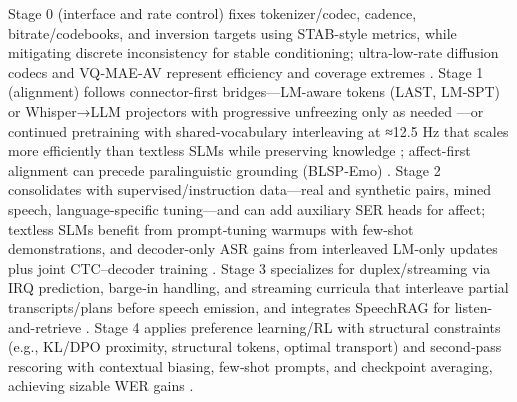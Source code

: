 \documentclass{article}
\begin{document}
Stage 0 (interface and rate control) fixes tokenizer/codec, cadence, bitrate/codebooks, and inversion targets using STAB-style metrics, while mitigating discrete inconsistency for stable conditioning; ultra‑low‑rate diffusion codecs and VQ‑MAE‑AV represent efficiency and coverage extremes \cite{vashishth2024stabspeechtokenizerassessmentbenchmark,liu2024analyzingmitigatinginconsistencydiscrete,wang2025tadicodectextawarediffusionspeechtokeniz,sadok2025vectorquantizedmaskedautoencoderaudiovis}. Stage 1 (alignment) follows connector-first bridges—LM-aware tokens (LAST, LM‑SPT) or Whisper→LLM projectors with progressive unfreezing only as needed \cite{turetzky2024lastlanguagemodelawarespeechtokenization,jo2025lmsptalignedsemanticdistillationspeechto,nguyen2025qwenvsgemmaintegrationwhispercomparative}—or continued pretraining with shared-vocabulary interleaving at ≈12.5 Hz that scales more efficiently than textless SLMs while preserving knowledge \cite{zeng2024scalingspeechtextpretrainingsyntheticint,maimon2025scalinganalysisinterleavedspeechtextlang,hassid2024textuallypretrainedspeechlanguagemodels,nachmani2024spokenquestionansweringspeechcontinuatio}; affect-first alignment can precede paralinguistic grounding (BLSP‑Emo) \cite{wang2024blspemotowardsempatheticlargespeechlangu}. Stage 2 consolidates with supervised/instruction data—real and synthetic pairs, mined speech, language-specific tuning—and can add auxiliary SER heads for affect; textless SLMs benefit from prompt‑tuning warmups with few-shot demonstrations, and decoder-only ASR gains from interleaved LM-only updates plus joint CTC–decoder training \cite{entry2025indicsuperbspeechprocessinguniversalperf,noroozi2024instructiondatagenerationunsupervisedada,lu2025desta2developinginstructionfollowingspee,wang2024blspemotowardsempatheticlargespeechlangu,hsu2024exploringcontextlearningtextlessspeechla,tsunoo2024decoderonlyarchitecturespeechrecognition}. Stage 3 specializes for duplex/streaming via IRQ prediction, barge‑in handling, and streaming curricula that interleave partial transcripts/plans before speech emission, and integrates SpeechRAG for listen-and-retrieve \cite{ma2024languagemodelcanlistenwhilespeaking,zeng2024scalingspeechtextpretrainingsyntheticint,min2025speechretrievalaugmentedgenerationwithou}. Stage 4 applies preference learning/RL with structural constraints (e.g., KL/DPO proximity, structural tokens, optimal transport) and second‑pass rescoring with contextual biasing, few‑shot prompts, and checkpoint averaging, achieving sizable WER gains \cite{li2025seewossubmissionmlcslmlessonslearnedspee,xu2025optimaltransportregularizationspeechtext,sun2023contextualbiasingnamedentitieslargelangu}.
\end{document}
